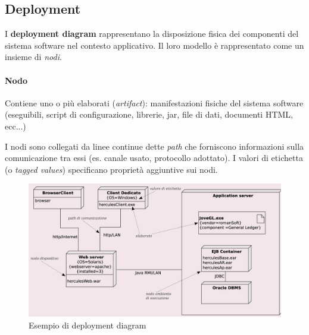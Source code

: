 \subsection{Deployment}

I \textbf{deployment diagram} rappresentano la disposizione fisica dei componenti del sistema software nel contesto applicativo. Il loro modello è rappresentato come un insieme di \textit{nodi}.

\paragraph{Nodo} Contiene uno o più elaborati (\textit{artifact}): manifestazioni fisiche del sistema software (eseguibili, script di configurazione, librerie, jar, file di dati, documenti HTML, ecc...)

I nodi sono collegati da linee continue dette \textit{path} che forniscono informazioni sulla comunicazione tra essi (es. canale usato, protocollo adottato). I valori di etichetta (o \textit{tagged values}) specificano proprietà aggiuntive sui nodi.

\begin{figure}[H]
    \centering
    \includegraphics[width=1\linewidth]{assets/UML/deployment/deployment.png}
    \caption{Esempio di deployment diagram}
\end{figure}

\newpage
